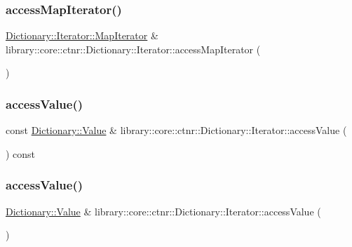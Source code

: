 \subsubsection{\texorpdfstring{accessMapIterator()}{accessMapIterator()}\hspace{0.1cm}{\footnotesize\ttfamily [2/2]}}
{\footnotesize\ttfamily \mbox{\hyperlink{classlibrary_1_1core_1_1ctnr_1_1_dictionary_1_1_iterator_a990205e908ac1bafcd754993219b805e}{Dictionary\+::\+Iterator\+::\+Map\+Iterator}} \& library\+::core\+::ctnr\+::\+Dictionary\+::\+Iterator\+::access\+Map\+Iterator (\begin{DoxyParamCaption}{ }\end{DoxyParamCaption})}

\mbox{\label{classlibrary_1_1core_1_1ctnr_1_1_dictionary_1_1_iterator_a4e823ea437e2fd87cd754df2db87f21e}} 
\subsubsection{\texorpdfstring{accessValue()}{accessValue()}\hspace{0.1cm}{\footnotesize\ttfamily [1/2]}}
{\footnotesize\ttfamily const \mbox{\hyperlink{classlibrary_1_1core_1_1ctnr_1_1_dictionary_a3baf6692694e4fc27cb399ac083c88ea}{Dictionary\+::\+Value}} \& library\+::core\+::ctnr\+::\+Dictionary\+::\+Iterator\+::access\+Value (\begin{DoxyParamCaption}{ }\end{DoxyParamCaption}) const}

\mbox{\label{classlibrary_1_1core_1_1ctnr_1_1_dictionary_1_1_iterator_ae0d3e2cab511ed5e25a44cd860dfb18e}} 
\subsubsection{\texorpdfstring{accessValue()}{accessValue()}\hspace{0.1cm}{\footnotesize\ttfamily [2/2]}}
{\footnotesize\ttfamily \mbox{\hyperlink{classlibrary_1_1core_1_1ctnr_1_1_dictionary_a3baf6692694e4fc27cb399ac083c88ea}{Dictionary\+::\+Value}} \& library\+::core\+::ctnr\+::\+Dictionary\+::\+Iterator\+::access\+Value (\begin{DoxyParamCaption}{ }\end{DoxyParamCaption})}


